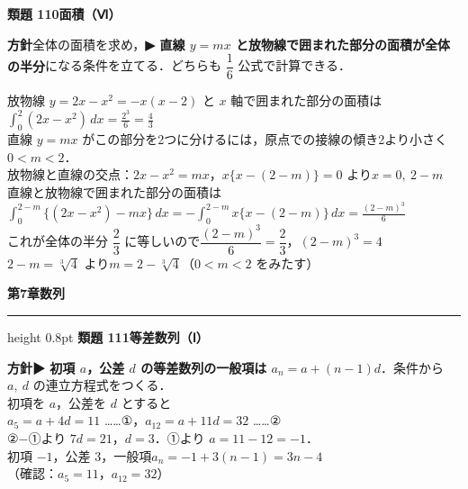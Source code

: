 \documentclass[a4paper,11pt]{ltjsarticle}
\newcommand{\ans}[2]{\Needspace{5\baselineskip}\vspace{6pt}%
  {\sffamily\bfseries 類題 #1\quad #2}\par}
\newcommand{\point}[1]{\textsf{\bfseries ▶ #1}}
\newcommand{\ax}[4]{\draw[->] (#1,0)--(#2,0) node[right]{\scriptsize $x$};
  \draw[->] (0,#3)--(0,#4) node[above]{\scriptsize $y$};
  \node[below left] at (0,0){\scriptsize O};}
\newcommand{\shouans}[2]{\Needspace{8\baselineskip}\vspace{10pt}\markboth{解答\quad #1\quad #2}{}%
  {\sffamily\bfseries\Large #1\quad #2\par}\vspace{2pt}\hrule height 0.8pt\vspace{2pt}}
\begin{document}
\ans{110}{面積（Ⅵ）}
\begin{kai}
\textbf{方針}\quad 全体の面積を求め，\point{直線 $y=mx$ と放物線で囲まれた部分の面積が全体の半分}になる条件を立てる．どちらも $\dfrac16$ 公式で計算できる．\\[2pt]
\begin{center}
\end{center}
放物線 $y=2x-x^2=-x(x-2)$ と $x$ 軸で囲まれた部分の面積は\\
\hspace*{1.5em}$\displaystyle\int_0^2(2x-x^2)\,dx=\frac{2^3}6=\frac43$\\[2pt]
直線 $y=mx$ がこの部分を2つに分けるには，原点での接線の傾き2より小さく $0<m<2$．\\
放物線と直線の交点：$2x-x^2=mx$，$x\{x-(2-m)\}=0$ より\quad $x=0,\ 2-m$\\
直線と放物線で囲まれた部分の面積は\\
\hspace*{1.5em}$\displaystyle\int_0^{2-m}\{(2x-x^2)-mx\}\,dx=-\int_0^{2-m}x\{x-(2-m)\}\,dx=\frac{(2-m)^3}6$\\[2pt]
これが全体の半分 $\dfrac23$ に等しいので\quad $\dfrac{(2-m)^3}6=\dfrac23$，\quad $(2-m)^3=4$\\
$2-m=\sqrt[3]4$ より\quad $m=2-\sqrt[3]4$\quad （$0<m<2$ をみたす）
\end{kai}

\shouans{第7章}{数列}
\ans{111}{等差数列（Ⅰ）}
\begin{kai}
\textbf{方針}\quad \point{初項 $a$，公差 $d$ の等差数列の一般項は $a_n=a+(n-1)d$}．条件から $a,\ d$ の連立方程式をつくる．\\[2pt]
初項を $a$，公差を $d$ とすると\\
\hspace*{1.5em}$a_5=a+4d=11$ ……①，\quad $a_{12}=a+11d=32$ ……②\\
②$-$①より $7d=21$，$d=3$．①より $a=11-12=-1$．\\[2pt]
初項 $-1$，公差 $3$，\quad 一般項\quad $a_n=-1+3(n-1)=3n-4$\\
（確認：$a_5=11$，$a_{12}=32$）
\end{kai}
\end{document}
